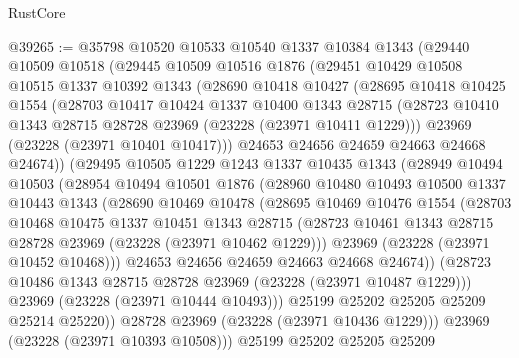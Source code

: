 \begin{lexlean}{RustCore}
\begin{coremodule}
@39265 := @35798
    @10520
    @10533
    @10540
    @1337
    @10384
    @1343
    (@29440
      @10509
      @10518
      (@29445
        @10509
        @10516
        @1876
        (@29451
          @10429
          @10508
          @10515
          @1337
          @10392
          @1343
          (@28690
            @10418
            @10427
            (@28695
              @10418
              @10425
              @1554
              (@28703
                @10417
                @10424
                @1337
                @10400
                @1343
                @28715
                (@28723 @10410 @1343 @28715 @28728 @23969 (@23228 (@23971 @10411 @1229)))
                @23969
                (@23228 (@23971 @10401 @10417)))
              @24653
              @24656
              @24659
              @24663
              @24668
              @24674))
          (@29495
            @10505
            @1229
            @1243
            @1337
            @10435
            @1343
            (@28949
              @10494
              @10503
              (@28954
                @10494
                @10501
                @1876
                (@28960
                  @10480
                  @10493
                  @10500
                  @1337
                  @10443
                  @1343
                  (@28690
                    @10469
                    @10478
                    (@28695
                      @10469
                      @10476
                      @1554
                      (@28703
                        @10468
                        @10475
                        @1337
                        @10451
                        @1343
                        @28715
                        (@28723 @10461 @1343 @28715 @28728 @23969 (@23228 (@23971 @10462 @1229)))
                        @23969
                        (@23228 (@23971 @10452 @10468)))
                      @24653
                      @24656
                      @24659
                      @24663
                      @24668
                      @24674))
                  (@28723 @10486 @1343 @28715 @28728 @23969 (@23228 (@23971 @10487 @1229)))
                  @23969
                  (@23228 (@23971 @10444 @10493)))
                @25199
                @25202
                @25205
                @25209
                @25214
                @25220))
            @28728
            @23969
            (@23228 (@23971 @10436 @1229)))
          @23969
          (@23228 (@23971 @10393 @10508)))
        @25199
        @25202
        @25205
        @25209

\end{coremodule}
\end{lexlean}
